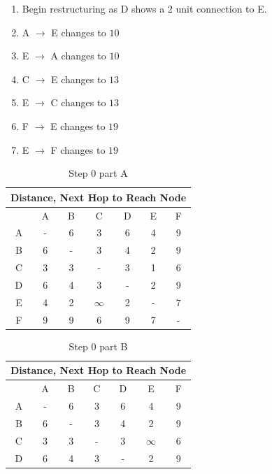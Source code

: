 \documentclass[12pt,addpoints,answers]{exam}
\begin{document}
\begin{questions}
\begin{solution}[5in]
\begin{enumerate}
		\item Begin restructuring as D shows a 2 unit connection to E.
		
		\item A $\rightarrow$ E changes to $10$
		\item E $\rightarrow$ A changes to $10$
		\item C $\rightarrow$ E changes to $13$
		\item E $\rightarrow$ C changes to $13$
		\item F $\rightarrow$ E changes to $19$
		\item E $\rightarrow$ F changes to $19$
	\end{enumerate}

\begin{table}[H]
	\centering
	\caption{Step 0 part A}
	\label{Solution 10}
	\begin{tabular}{|c|c|c|c|c|c|c|}
		\hline
		\multicolumn{7}{|c|}{Distance, Next Hop to Reach Node} \\ \hline
		& A   & B   & C          & D   & E          & F   \\ \hline
		A    & -   & 6   & 3          & 6   & 4          & 9   \\
		B    & 6   & -   & 3          & 4   & 2          & 9   \\
		C    & 3   & 3   & -          & 3   & 1   & 6   \\
		D    & 6   & 4   & 3          & -   & 2          & 9   \\
		E    & 4   & 2   & $\infty$   & 2   & -          & 7   \\
		F    & 9   & 9   & 6          & 9   & 7          & -  \\ \hline
	\end{tabular}
\end{table}
\begin{table}[H]
	\centering
	\caption{Step 0 part B}
	\label{Solution 10}
	\begin{tabular}{|c|c|c|c|c|c|c|}
		\hline
		\multicolumn{7}{|c|}{Distance, Next Hop to Reach Node} \\ \hline
		& A   & B   & C          & D   & E          & F   \\ \hline
		A    & -   & 6   & 3          & 6   & 4          & 9   \\
		B    & 6   & -   & 3          & 4   & 2          & 9   \\
		C    & 3   & 3   & -          & 3   & $\infty$   & 6   \\
		D    & 6   & 4   & 3          & -   & 2          & 9   \\

\end{tabular}
\end{table}
\end{solution}
\end{questions}
\end{document}
